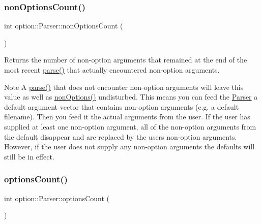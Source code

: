 \subsubsection{\texorpdfstring{non\+Options\+Count()}{nonOptionsCount()}}
{\footnotesize\ttfamily int option\+::\+Parser\+::non\+Options\+Count (\begin{DoxyParamCaption}{ }\end{DoxyParamCaption})\hspace{0.3cm}{\ttfamily [inline]}}



Returns the number of non-\/option arguments that remained at the end of the most recent \hyperlink{classoption_1_1_parser_a6e0b5778d1cfbd6cd51240e74d01e138}{parse()} that actually encountered non-\/option arguments. 

\begin{DoxyNote}{Note}
A \hyperlink{classoption_1_1_parser_a6e0b5778d1cfbd6cd51240e74d01e138}{parse()} that does not encounter non-\/option arguments will leave this value as well as \hyperlink{classoption_1_1_parser_a2c11b050f4248d71758dda52c5f9154d}{non\+Options()} undisturbed. This means you can feed the \hyperlink{classoption_1_1_parser}{Parser} a default argument vector that contains non-\/option arguments (e.\+g. a default filename). Then you feed it the actual arguments from the user. If the user has supplied at least one non-\/option argument, all of the non-\/option arguments from the default disappear and are replaced by the user\textquotesingle{}s non-\/option arguments. However, if the user does not supply any non-\/option arguments the defaults will still be in effect. 
\end{DoxyNote}
\mbox{\label{classoption_1_1_parser_aee62badd2a19a5b88cbc4a9b11813b82}} 
\subsubsection{\texorpdfstring{options\+Count()}{optionsCount()}}
{\footnotesize\ttfamily int option\+::\+Parser\+::options\+Count (\begin{DoxyParamCaption}{ }\end{DoxyParamCaption})\hspace{0.3cm}{\ttfamily [inline]}}



